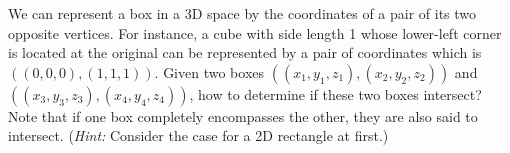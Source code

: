 We can represent a box in a 3D space by the coordinates of a pair of its two
opposite vertices. For instance, a cube with side length 1 whose 
lower-left corner is
located at the original can be represented by a pair of coordinates
which is $((0,0,0),(1,1,1))$. Given two boxes $((x_1,y_1,z_1),
(x_2,y_2,z_2))$ and $((x_3,y_3,z_3),(x_4,y_4,z_4))$, how to determine
if these two boxes intersect? Note that if one box completely encompasses
the other, they are also said to intersect. ({\em Hint:} Consider the
case for a 2D rectangle at first.)

